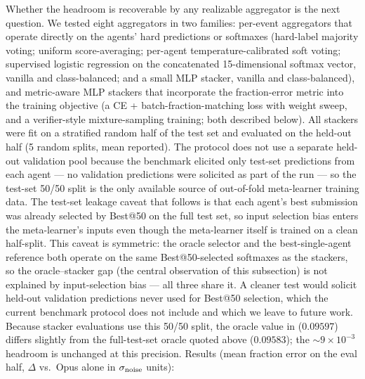 \documentclass[universe,article,submit,pdftex,oneauthor]{Definitions/mdpi}
\begin{document}
Whether the headroom is recoverable by any realizable aggregator is the next question. We tested eight aggregators in two families: per-event aggregators that operate directly on the agents' hard predictions or softmaxes (hard-label majority voting; uniform score-averaging; per-agent temperature-calibrated soft voting; supervised logistic regression on the concatenated 15-dimensional softmax vector, vanilla and class-balanced; and a small MLP stacker, vanilla and class-balanced), and metric-aware MLP stackers that incorporate the fraction-error metric into the training objective (a CE + batch-fraction-matching loss with weight sweep, and a verifier-style mixture-sampling training; both described below). All stackers were fit on a stratified random half of the test set and evaluated on the held-out half (5 random splits, mean reported). The protocol does not use a separate held-out validation pool because the benchmark elicited only test-set predictions from each agent --- no validation predictions were solicited as part of the run --- so the test-set 50/50 split is the only available source of out-of-fold meta-learner training data. The test-set leakage caveat that follows is that each agent's best submission was already selected by Best@50 on the full test set, so input selection bias enters the meta-learner's inputs even though the meta-learner itself is trained on a clean half-split. This caveat is symmetric: the oracle selector and the best-single-agent reference both operate on the same Best@50-selected softmaxes as the stackers, so the oracle--stacker gap (the central observation of this subsection) is not explained by input-selection bias --- all three share it. A cleaner test would solicit held-out validation predictions never used for Best@50 selection, which the current benchmark protocol does not include and which we leave to future work. Because stacker evaluations use this 50/50 split, the oracle value in  ($0.09597$) differs slightly from the full-test-set oracle quoted above ($0.09583$); the ${\sim}9 \times 10^{-3}$ headroom is unchanged at this precision. Results (mean fraction error on the eval half, $\Delta$ vs.\ Opus alone in $\sigma_{\rm noise}$ units):
\end{document}
